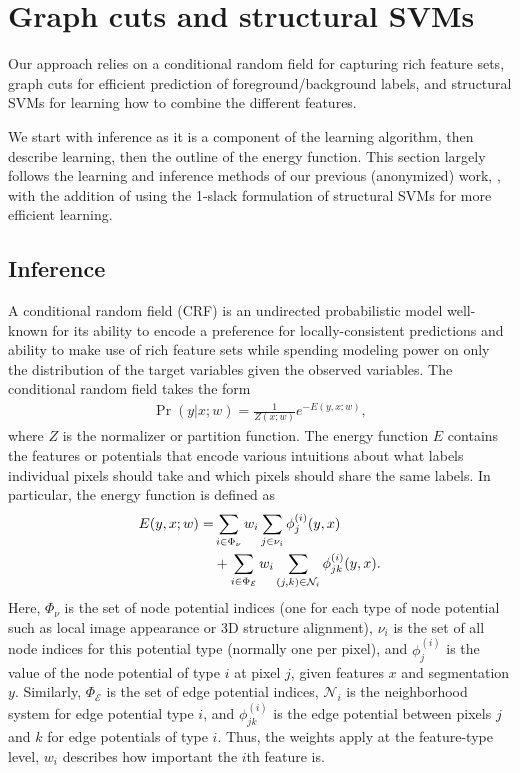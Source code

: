 \documentclass[conference]{IEEEtran}
\begin{document}
\section{Graph cuts and structural SVMs}

Our approach relies on a conditional random field for capturing rich feature sets, graph cuts for efficient prediction of foreground/background labels, and structural SVMs for learning how to combine the different features.

We start with inference as it is a component of the learning algorithm, then describe learning, then the outline of the energy function.  This section largely follows the learning and inference methods of our previous (anonymized) work, \cite{teichman2012a}, with the addition of using the 1-slack formulation of structural SVMs \cite{joachims2009a} for more efficient learning.

\subsection{Inference}
\label{sec:inference}

A conditional random field (CRF) is an undirected probabilistic model well-known for its ability to encode a preference for locally-consistent predictions and ability to make use of rich feature sets while spending modeling power on only the distribution of the target variables given the observed variables.  The conditional random field takes the form
\begin{align}
  \Pr(y | x; w) = \frac{1}{Z(x; w)} e^{-E(y, x; w)},
\end{align}
where $Z$ is the normalizer or partition function.  The energy function $E$ contains the features or potentials that encode various intuitions about what labels individual pixels should take and which pixels should share the same labels.  In particular, the energy function is defined as
\begin{align}
  E(y, x; w) = & \sum_{i \in \Phi_\nu} w_i \sum_{j \in \nu_i} \phi_j^{(i)}(y, x) \label{eqn:energy} \\
& + \sum_{i \in \Phi_{\mathcal{E}}} w_i \sum_{(j,k) \in \mathcal{N}_i}  \phi_{jk}^{(i)}(y, x). \notag
\end{align}
Here, $\Phi_\nu$ is the set of node potential indices (\ie one for each type of node potential such as local image appearance or 3D structure alignment), $\nu_i$ is the set of all node indices for this potential type (\ie normally one per pixel), and $\phi_j^{(i)}$ is the value of the node potential of type $i$ at pixel $j$, given features $x$ and segmentation $y$.  Similarly, $\Phi_\mathcal{E}$ is the set of edge potential indices, $\mathcal{N}_i$ is the neighborhood system for edge potential type $i$, and $\phi_{jk}^{(i)}$ is the edge potential between pixels $j$ and $k$ for edge potentials of type $i$.  Thus, the weights apply at the feature-type level, \ie $w_i$ describes how important the $i$th feature is.
\end{document}
